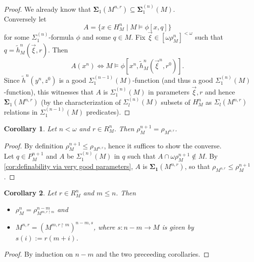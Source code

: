 \documentclass[12pt,a4paper]{article}
\theoremstyle{nicestyle}
\newtheorem{corollary}{Corollary}[subsection]
\begin{document}
\begin{proof}
  We already know that $\boldsymbol{\Sigma}_1(M^{n,r}) \subseteq \boldsymbol{\Sigma}^{(n)}_{1}(M)$. \\

  Conversely let
  \[
    A = \{ x \in H^{n}_{M} \mid M \models \phi[x, q] \}
  \]
  for some $\Sigma^{(n)}_{1}$-formula $\phi$ and some $q \in M$. Fix
  $\vec{\xi} \in [\omega \rho^{n}_{M}]^{< \omega}$ such that
  $q = \tilde{h}^{n}_{M}(\vec{\xi}, r)$. Then
  \[
    A(x^{n}) \iff M \models \phi[x^{n},
    \tilde{h}^{n}_{M}(\vec{\xi}^{n}, r^{0})].
  \]
  Since $\tilde{h}^{n}(y^{n}, z^{0})$ is a good
  $\Sigma^{(n-1)}_{1}(M)$-function (and thus a good
  $\Sigma^{(n)}_{1}(M)$-function), this witnesses that $A$ is
  $\Sigma^{(n)}_{1}(M)$ in parameters $\vec{\xi}, r$ and hence
  $\boldsymbol{\Sigma}_{1}(M^{n,r})$ (by the characterization of
  $\Sigma^{(n)}_{l}(M)$ subsets of $H^{n}_{M}$ as
  $\Sigma_{l}(M^{n,r})$ relations in $\Sigma^{(n-1)}_{1}(M)$
  predicates).
\end{proof}

\begin{corollary}
  Let $n < \omega$ and $r \in R^{n}_{M}$. Then
  $\rho^{n+1}_{M} = \rho_{M^{n,r}}$.
\end{corollary}

\begin{proof}
  By definition $\rho^{n+1}_{M} \le \rho_{M^{n,r}}$, hence it suffices
  to show the converse. \\
  Let $q \in P^{n+1}_{M}$ and $A$ be $\Sigma^{(n)}_{1}(M)$ in $q$ such
  that $A \cap \omega\rho^{n+1}_{M} \not \in M$. By
  \autoref{cor:definability via very good parameters}, $A$ is
  $\boldsymbol{\Sigma_{1}}(M^{n,r})$, so that
  $\rho_{M^{n,r}} \le \rho^{n+1}_{M}$.
\end{proof}

\begin{corollary}
  Let $r \in R^{n}_{M}$ and $m \le n$. Then
  \begin{itemize}
  \item $\rho^{n}_{M} = \rho^{n-m}_{M^{m, r \restriction m}}$ and
  \item $M^{n, r} = (M^{m, r \restriction m})^{n-m, s}$, where
    $s \colon n-m \to M$ is given by $s(i) := r(m+i)$.
  \end{itemize}
\end{corollary}

\begin{proof}
  By induction on $n-m$ and the two preceeding corollaries.
\end{proof}
\end{document}
